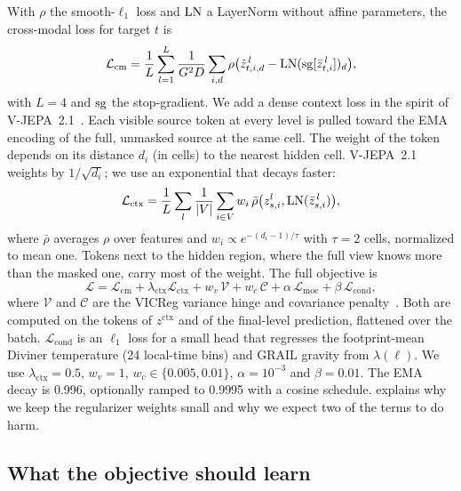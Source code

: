 With $\rho$ the smooth-$\ell_1$ loss and $\operatorname{LN}$ a LayerNorm without affine parameters, the cross-modal loss for target $t$ is
\begin{equation}
  \mathcal{L}_{\text{cm}} = \frac{1}{L}\sum_{l=1}^{L} \frac{1}{G^2 D}\sum_{i,d}
  \rho\big(\hat z^{\,l}_{t,i,d} - \operatorname{LN}(\operatorname{sg}[\bar z^{\,l}_{t,i}])_d\big),
  \label{eq:cm}
\end{equation}
with $L{=}4$ and $\operatorname{sg}$ the stop-gradient. We add a dense context loss in the spirit of V-JEPA~2.1~\cite{murlabadia2026vjepa}. Each visible source token at every level is pulled toward the EMA encoding of the full, unmasked source at the same cell. The weight of the token depends on its distance $d_i$ (in cells) to the nearest hidden cell. V-JEPA~2.1 weights by $1/\sqrt{d_i}$; we use an exponential that decays faster:
\begin{equation}
  \mathcal{L}_{\text{ctx}} = \frac{1}{L}\sum_{l} \frac{1}{|V|}\sum_{i\in V} w_i\, \bar\rho\big(z^{l}_{s,i}, \operatorname{LN}(\bar z^{\,l}_{s,i})\big),
  \label{eq:ctx}
\end{equation}
where $\bar\rho$ averages $\rho$ over features and $w_i \propto e^{-(d_i-1)/\tau}$ with $\tau{=}2$ cells, normalized to mean one. Tokens next to the hidden region, where the full view knows more than the masked one, carry most of the weight. The full objective is
\begin{equation}
  \mathcal{L} = \mathcal{L}_{\text{cm}} + \lambda_{\text{ctx}}\mathcal{L}_{\text{ctx}}
  + w_v\,\mathcal{V} + w_c\,\mathcal{C} + \alpha\,\mathcal{L}_{\text{moe}} + \beta\,\mathcal{L}_{\text{cond}},
  \label{eq:total}
\end{equation}
where $\mathcal{V}$ and $\mathcal{C}$ are the VICReg variance hinge and covariance penalty~\cite{bardes2022vicreg}. Both are computed on the tokens of $z^{\text{ctx}}$ and of the final-level prediction, flattened over the batch. $\mathcal{L}_{\text{cond}}$ is an $\ell_1$ loss for a small head that regresses the footprint-mean Diviner temperature (24 local-time bins) and GRAIL gravity from $\lambda(\ell)$. We use $\lambda_{\text{ctx}}{=}0.5$, $w_v{=}1$, $w_c \in \{0.005, 0.01\}$, $\alpha{=}10^{-3}$ and $\beta{=}0.01$. The EMA decay is 0.996, optionally ramped to 0.9995 with a cosine schedule.  explains why we keep the regularizer weights small and why we expect two of the terms to do harm.

\subsection{What the objective should learn}
\label{sec:h1}

